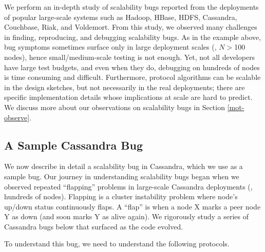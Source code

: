 We perform an in-depth study of
\totAll scalability bugs reported from the deployments
of popular large-scale systems such as
Hadoop,
HBase,
HDFS,
Cassandra,
Couchbase,
Riak, and
Voldemort.
%
From this study, we observed many challenges in finding, reproducing, and
debugging scalability bugs.
%
As in the example above, bug symptoms sometimes surface only in large
deployment scales (\eg, $N$$>$100 nodes), hence small/medium-scale testing
is not enough.  Yet, not all developers have large test budgets, and even
when they do, debugging on hundreds of nodes is time consuming and
difficult.
%
Furthermore, protocol algorithms can be scalable in the design sketches,
but not necessarily in the real deployments; there are specific
implementation details whose implications at scale are hard to predict. We
discuss more about our observations on scalability bugs in Section \ref{mot-observe}.



\subsection{A Sample Cassandra Bug}
\label{mot-bug}



We now describe in detail a scalability bug in Cassandra, which we use as a
sample bug.
%
Our journey in understanding scalability bugs began when we observed repeated
``flapping'' problems in large-scale Cassandra deployments (\ie, hundreds of
nodes).
%
Flapping is a cluster instability problem where node's up/down status
continuously flaps.  A ``flap'' is when a node X marks a peer node Y as down
(and soon marks Y as alive again).
%
We rigorously study a series of Cassandra bugs below that surfaced as the code
evolved.

%

To understand this bug, we need to understand the following protocols.

